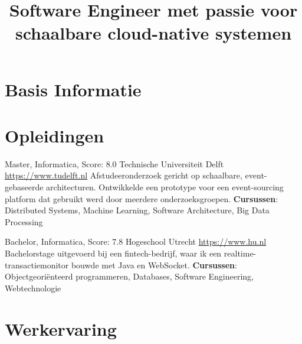 \documentclass[a4paper, serif, 10pt]{moderncv}
\title{Software Engineer met passie voor schaalbare cloud-native systemen}
\begin{document}
\maketitle

\section{Basis Informatie}

\section{Opleidingen}

        {Master, Informatica, Score: 8.0}
        {Technische Universiteit Delft}
        {\url{https://www.tudelft.nl}}
        {}
        {Afstudeeronderzoek gericht op schaalbare, event-gebaseerde architecturen.
Ontwikkelde een prototype voor een event-sourcing platform dat gebruikt
werd door meerdere onderzoeksgroepen.
\textbf{Cursussen}: Distributed Systems, Machine Learning, Software Architecture, Big Data Processing}

        {Bachelor, Informatica, Score: 7.8}
        {Hogeschool Utrecht}
        {\url{https://www.hu.nl}}
        {}
        {Bachelorstage uitgevoerd bij een fintech-bedrijf, waar ik een
realtime-transactiemonitor bouwde met Java en WebSocket.
\textbf{Cursussen}: Objectgeoriënteerd programmeren, Databases, Software Engineering, Webtechnologie}
\section{Werkervaring}
\end{document}
